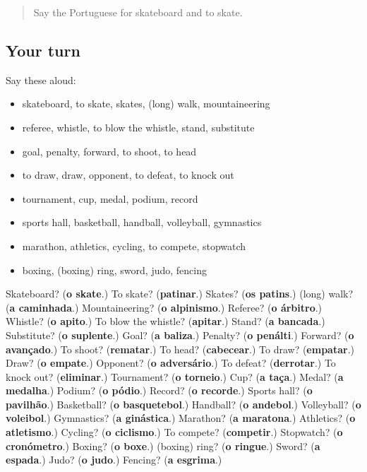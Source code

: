 \label{lesson:PT-R514-revisao-507-514}



\begin{quote}
Say the Portuguese for skateboard and to skate.
\end{quote}

\subsection*{Your turn}
Say these aloud:

\begin{itemize}
\raggedright
  \item skateboard, to skate, skates, (long) walk, mountaineering
  \item referee, whistle, to blow the whistle, stand, substitute
  \item goal, penalty, forward, to shoot, to head
  \item to draw, draw, opponent, to defeat, to knock out
  \item tournament, cup, medal, podium, record
  \item sports hall, basketball, handball, volleyball, gymnastics
  \item marathon, athletics, cycling, to compete, stopwatch
  \item boxing, (boxing) ring, sword, judo, fencing
\end{itemize}

\begin{tcolorbox}[breakable,colback=teal!4,colframe=teal!35!black,title={Before you move on}]
Skateboard? (\textbf{o skate}.) To skate? (\textbf{patinar}.) Skates? (\textbf{os patins}.) (long) walk? (\textbf{a caminhada}.) Mountaineering? (\textbf{o alpinismo}.) Referee? (\textbf{o árbitro}.) Whistle? (\textbf{o apito}.) To blow the whistle? (\textbf{apitar}.) Stand? (\textbf{a bancada}.) Substitute? (\textbf{o suplente}.) Goal? (\textbf{a baliza}.) Penalty? (\textbf{o penálti}.) Forward? (\textbf{o avançado}.) To shoot? (\textbf{rematar}.) To head? (\textbf{cabecear}.) To draw? (\textbf{empatar}.) Draw? (\textbf{o empate}.) Opponent? (\textbf{o adversário}.) To defeat? (\textbf{derrotar}.) To knock out? (\textbf{eliminar}.) Tournament? (\textbf{o torneio}.) Cup? (\textbf{a taça}.) Medal? (\textbf{a medalha}.) Podium? (\textbf{o pódio}.) Record? (\textbf{o recorde}.) Sports hall? (\textbf{o pavilhão}.) Basketball? (\textbf{o basquetebol}.) Handball? (\textbf{o andebol}.) Volleyball? (\textbf{o voleibol}.) Gymnastics? (\textbf{a ginástica}.) Marathon? (\textbf{a maratona}.) Athletics? (\textbf{o atletismo}.) Cycling? (\textbf{o ciclismo}.) To compete? (\textbf{competir}.) Stopwatch? (\textbf{o cronómetro}.) Boxing? (\textbf{o boxe}.) (boxing) ring? (\textbf{o ringue}.) Sword? (\textbf{a espada}.) Judo? (\textbf{o judo}.) Fencing? (\textbf{a esgrima}.)
\end{tcolorbox}
